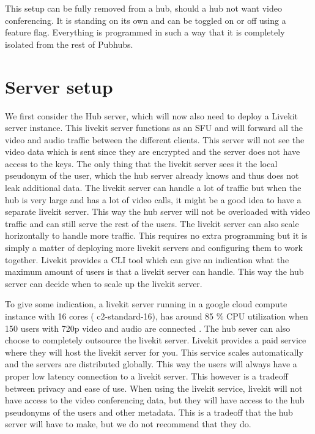 \documentclass{report}
\begin{document}
This setup can be fully removed from a hub, should a hub not want video conferencing. It is standing on its own and
can be toggled on or off using a feature flag. Everything is programmed in such a way that it is completely isolated
from the rest of Pubhubs.


\section{Server setup}
We first consider the Hub server, which will now also need to deploy a Livekit server instance. This livekit server
functions as an SFU and will forward all the video and audio traffic between the different clients. This server will
not see the video data which is sent since they are encrypted and the server does not have access to the keys. The
only thing that the livekit server sees it the local pseudonym of the user, which the hub server already knows and
thus does not leak additional data. The livekit server can handle a lot of traffic but when the hub is very large
and has a lot of video calls, it might be a good idea to have a separate livekit server. This way the hub server
will not be overloaded with video traffic and can still serve the rest of the users. The livekit server can also
scale horizontally to handle more traffic. This requires no extra programming but it is simply a matter of deploying
more livekit servers and configuring them to work together. Livekit provides a CLI tool which can give an
indication what the maximum amount of users is that a livekit server can handle. This way the hub server can decide
when to scale up the livekit server.

To give some indication, a livekit server running in a google cloud compute instance with 16 cores (
c2-standard-16), has around 85 \% CPU utilization when 150 users with 720p video and audio are connected
\cite{noauthor_benchmarking_nodate}. The hub sever can also choose to completely outsource the livekit server.
Livekit provides a paid service where they will host the livekit server for you. This service scales
automatically and the servers are distributed globally. This way the users will always have a proper low
latency connection to a livekit server. This however is a tradeoff between privacy and ease of use. When using
the livekit service, livekit will not have access to the video conferencing data, but they will have access to
the hub pseudonyms of the users and other metadata. This is a tradeoff that the hub server will have to make,
but we do not recommend that they do.
\end{document}
